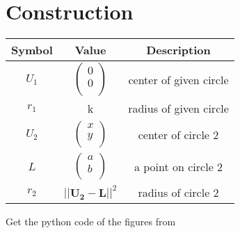 \documentclass[journal,12pt,twocolumn]{IEEEtran}
\let\vec\mathbf
\begin{document}
\section*{Construction}
\centering
\vspace{0.2cm}
{
\setlength\extrarowheight{2pt}
\begin{tabular}{|c|c|c|}
	\hline
	\textbf{Symbol}&\textbf{Value}&\textbf{Description}\\
	\hline
	$U_1$ & $\begin{pmatrix}0 \\ 0 \\ \end{pmatrix}$ & center of given circle\\
	\hline
	$r_1$ & k & radius of given circle\\
	\hline
	$U_2$ & $\begin{pmatrix}x \\ y \\ \end{pmatrix}$ & center of circle 2\\
	\hline
	$L$ & $\begin{pmatrix}a \\ b \\ \end{pmatrix}$ & a point on  circle 2\\
	\hline
	$r_2$ & $||{\vec{U_2}-\vec{L}}||^2$ & radius of circle 2\\
	\hline
\end{tabular}
}

\vspace{3cm}
Get the python code of the figures from
\begin{table}[h]
\large
\centering
{}

\end{table}
\end{document}
